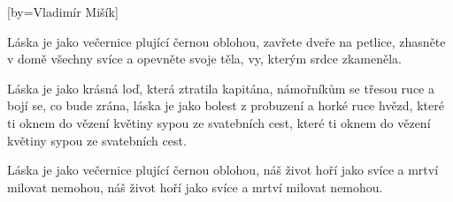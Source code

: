 [by={Vladimír Mišík}]

\beginverse{}
Láska je jako večernice plující černou oblohou,
zavřete dveře na petlice, zhasněte v domě všechny svíce
a opevněte svoje těla, vy, kterým srdce zkameněla.
\endverse{}

\beginverse*{}
            
\endverse{}

\beginverse{}
\chordsoff{}
Láska je jako krásná loď, která ztratila kapitána,
námořníkům se třesou ruce a bojí se, co bude zrána,
láska je jako bolest z probuzení a horké ruce hvězd,
které ti oknem do vězení květiny sypou ze svatebních cest,
které ti oknem do vězení květiny sypou ze svatebních cest.
\chordson{}
\endverse{}

\beginverse*{}
            
\endverse{}

\beginverse{}
\chordsoff{}
Láska je jako večernice plující černou oblohou,
náš život hoří jako svíce a mrtví milovat nemohou,
náš život hoří jako svíce a mrtví milovat nemohou.
\chordson{}
\endverse{}

\endsong{}
